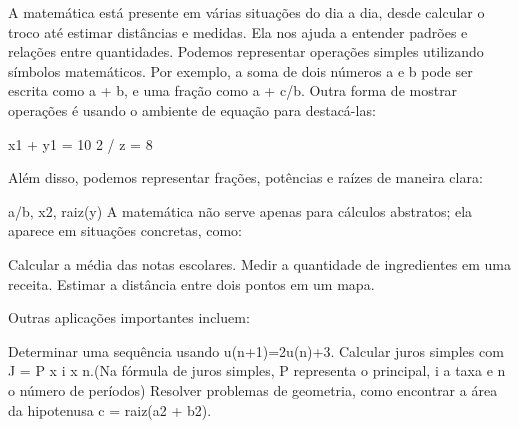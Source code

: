 \documentclass{article}
\begin{document}
A matemática está presente em várias situações do dia a dia, desde calcular o troco até estimar distâncias e medidas.  
Ela nos ajuda a entender padrões e relações entre quantidades.
Podemos representar operações simples utilizando símbolos matemáticos. Por exemplo, a soma de dois números a e b pode ser escrita como a + b, e uma fração  como a + c/b.
Outra forma de mostrar operações é usando o ambiente de equação para destacá-las:

x1 + y1 = 10
2 / z = 8

Além disso, podemos representar frações, potências e raízes de maneira clara:

a/b, x2, raiz(y)
A matemática não serve apenas para cálculos abstratos; ela aparece em situações concretas, como:

    Calcular a  média das notas escolares.  
    Medir a quantidade de ingredientes em uma receita.  
    Estimar a distância entre dois pontos em um mapa.

Outras aplicações importantes incluem:

    Determinar uma sequência usando u(n+1)=2u(n)+3.  
    Calcular juros simples com J = P x i x n.(Na fórmula de juros simples, P representa o principal, i a taxa e n o número de períodos)
    Resolver problemas de geometria, como encontrar a área da hipotenusa c = raiz(a2 + b2). 
\end{document}
